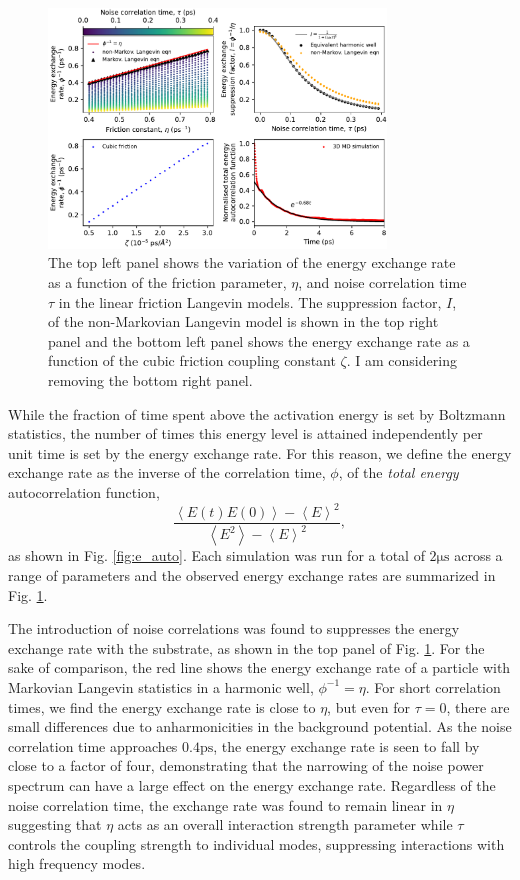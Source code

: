 \documentclass[7pt]{article}
\newcommand{\ps}{\si{\pico\second}}
\newcommand{\us}{\si{\micro\second}}
\begin{document}
\begin{figure}
	\centering
	\includegraphics[width=0.8\textwidth]{energy_exchange_rates}
	\caption{The top left panel shows the variation of the energy exchange rate as a function of the friction parameter, $\eta$, and noise correlation time $\tau$ in the linear friction Langevin models. The suppression factor, $I$, of the non-Markovian Langevin model is shown in the top right panel and the bottom left panel shows the energy exchange rate as a function of the cubic friction coupling constant $\zeta$. I am considering removing the bottom right panel.}
	\label{fig:energy_exchange_rates}
\end{figure}

While the fraction of time spent above the activation energy is set by Boltzmann statistics, the number of times this energy level is attained independently per unit time is set by the energy exchange rate. For this reason, we define the energy exchange rate as the inverse of the correlation time, $\phi$, of the \emph{total energy} autocorrelation function, $$\frac{\left<E(t)E(0)\right> - \left<E\right>^2}{\left<E^2\right> - \left<E\right>^2},$$ as shown in Fig. \ref{fig:e_auto}. Each simulation was run for a total of $2\us$ across a range of parameters and the observed energy exchange rates are summarized in Fig. \ref{fig:energy_exchange_rates}. 
 
The introduction of noise correlations was found to suppresses the energy exchange rate with the substrate, as shown in the top panel of Fig. \ref{fig:energy_exchange_rates}. For the sake of comparison, the red line shows the energy exchange rate of a particle with Markovian Langevin statistics in a harmonic well, $\phi^{-1}=\eta$. For short correlation times, we find the energy exchange rate is close to $\eta$, but even for $\tau=0$, there are small differences due to anharmonicities in the background potential. As the noise correlation time approaches $0.4\ps$, the energy exchange rate is seen to fall by close to a factor of four, demonstrating that the narrowing of the noise power spectrum can have a large effect on the energy exchange rate. Regardless of the noise correlation time, the exchange rate was found to remain linear in $\eta$ suggesting that $\eta$ acts as an overall interaction strength parameter while $\tau$ controls the coupling strength to individual modes, suppressing interactions with high frequency modes. 
\end{document}
